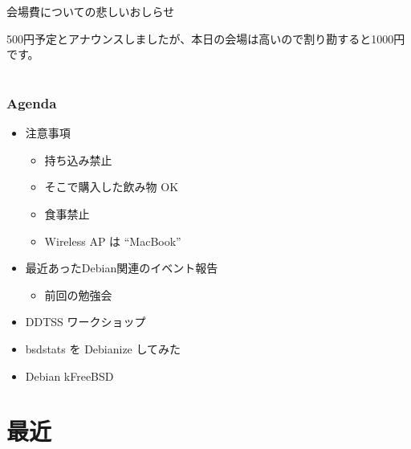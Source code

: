 \begin{frame}{会場費についての悲しいおしらせ}

500円予定とアナウンスしましたが、本日の会場は高いので割り勘すると1000円です。

\end{frame}

\section{}
\begin{frame}
 \frametitle{Agenda}
\begin{minipage}[t]{0.45\hsize}
  \begin{itemize}
  \item 注意事項
	\begin{itemize}
	 \item 持ち込み禁止
	 \item そこで購入した飲み物 OK
	 \item 食事禁止
	 \item Wireless AP は ``MacBook''
	\end{itemize}
  \item 最近あったDebian関連のイベント報告
	\begin{itemize}
	 \item 前回の勉強会
	\end{itemize}
 \end{itemize}
\end{minipage} 
\begin{minipage}[t]{0.45\hsize}
 \begin{itemize}
  \item DDTSS ワークショップ
  \item bsdstats を Debianize してみた
  \item Debian kFreeBSD
 \end{itemize}
\end{minipage}
\end{frame}

\section{最近}


